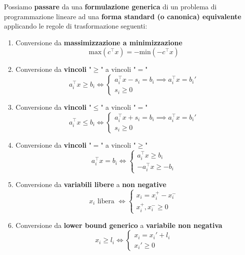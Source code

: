 Possiamo \textbf{passare} da una \textbf{formulazione generica} di un problema
di programmazione lineare ad una \textbf{forma standard (o canonica) equivalente} applicando
le regole di trasformazione seguenti:

\begin{enumerate}
    \item Conversione da \textbf{massimizzazione a minimizzazione}
        \[
            \text{max}(c^\top x) = -\text{min}(-c^\top x)
        \] 
    \item Conversione da \textbf{vincoli} "$\ge $" a vincoli "$=$"
        \[
            a_i^\top x \ge b_i \Longleftrightarrow \begin{cases}
                a_i^\top x - s_i = b_i \implies a_i^\top x = b_i'  \\ 
                s_i \ge 0
            \end{cases}
        \] 
    \item Conversione da \textbf{vincoli} "$\le $" a vincoli "$=$"
        \[
            a_i^\top x \le b_i \Longleftrightarrow \begin{cases}
                a_i^\top x + s_i = b_i \implies a_i^\top x = b_i'  \\ 
                s_i \ge 0
            \end{cases}
        \]
    \item Conversione da \textbf{vincoli} "$=$" a vincoli "$\ge$"
        \[
            a_i^\top x = b_i \Longleftrightarrow \begin{cases}
                a_i^\top x \ge  b_i  \\ 
                -a_i^\top x \ge -b_i
            \end{cases}
        \] 
    \item Conversione da \textbf{variabili libere} a \textbf{non negative}
        \[
            x_i \text{ libera } \Longleftrightarrow \begin{cases}
                x_i = x_i^+ - x_i^- \\ 
                x_i^+,x_i^- \ge 0
            \end{cases}
        \] 
    \item Conversione da \textbf{lower bound generico} a \textbf{variabile non negativa}
        \[
            x_i \ge l_i \Longleftrightarrow \begin{cases}
                x_i = x_i' + l_i \\
                x_i' \ge0
            \end{cases}
\]
\end{enumerate}
